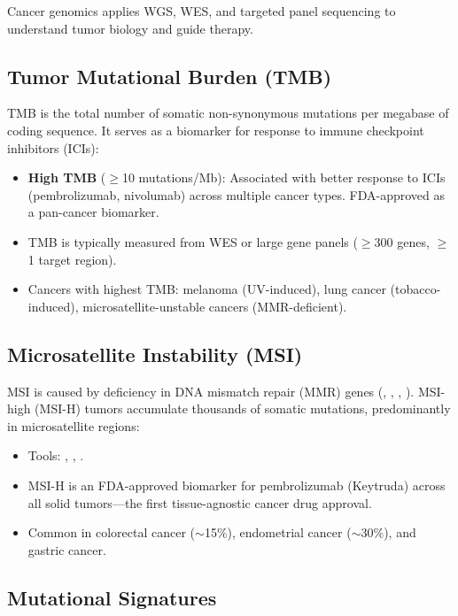 Cancer genomics applies WGS, WES, and targeted panel sequencing to understand tumor biology and guide therapy.

\subsection{Tumor Mutational Burden (TMB)}

TMB is the total number of somatic non-synonymous mutations per megabase of coding sequence. It serves as a biomarker for response to immune checkpoint inhibitors (ICIs):

\begin{itemize}[nosep]
  \item \textbf{High TMB} ($\geq$10 mutations/Mb): Associated with better response to ICIs (pembrolizumab, nivolumab) across multiple cancer types. FDA-approved as a pan-cancer biomarker.
  \item TMB is typically measured from WES or large gene panels ($\geq$300 genes, $\geq$1\megabase{} target region).
  \item Cancers with highest TMB: melanoma (UV-induced), lung cancer (tobacco-induced), microsatellite-unstable cancers (MMR-deficient).
\end{itemize}

\subsection{Microsatellite Instability (MSI)}

MSI is caused by deficiency in DNA mismatch repair (MMR) genes (, , , ). MSI-high (MSI-H) tumors accumulate thousands of somatic mutations, predominantly in microsatellite regions:

\begin{itemize}[nosep]
  \item Tools: , , .
  \item MSI-H is an FDA-approved biomarker for pembrolizumab (Keytruda) across all solid tumors---the first tissue-agnostic cancer drug approval.
  \item Common in colorectal cancer ($\sim$15\%), endometrial cancer ($\sim$30\%), and gastric cancer.
\end{itemize}

\subsection{Mutational Signatures}

